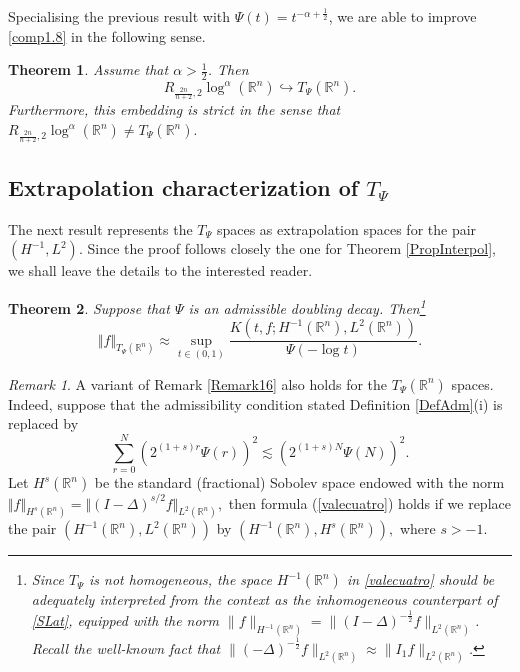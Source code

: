 \documentclass[11pt, a4paper,leqno]{amsart}
\newtheorem{theorem}{Theorem}
\theoremstyle{plain}
\numberwithin{equation}{section}
\theoremstyle{definition}
\theoremstyle{remark}
\newtheorem{remark}{Remark}
\def\R{\mathbb{R}}
\begin{document}
Specialising the previous result with $\Psi(t) = t^{-\alpha + \frac{1}{2}}$, we are able to improve 	\eqref{comp1.8} in the following sense.

\begin{theorem}
\label{Theorem4.8} Assume that $\alpha>\frac{1}{2}$. Then
$$
R_{\frac{2n}{n+2},2}\log^{\alpha}(\mathbb{R}^{n})\hookrightarrow T_{\Psi
}(\mathbb{R}^{n}). \label{414}%
$$
Furthermore, this embedding is strict in the sense that $R_{\frac{2n}{n+2},2}\log^{\alpha}(\mathbb{R}^{n})\neq T_{\Psi}(\mathbb{R}%
^{n}).$

\end{theorem}

\subsection{Extrapolation characterization of $T_\Psi$}
The next result represents the $T_{\Psi}$ spaces as extrapolation spaces for
the pair $(H^{-1},L^{2}).$ Since the proof follows closely the one for Theorem
\ref{PropInterpol}, we shall leave the details to the interested reader.

\begin{theorem}
\label{PropInterpolDoubling} Suppose that $\Psi$ is an admissible doubling decay. Then\footnote{Since $T_\Psi$ is not   homogeneous, the space $H^{-1}(\R^n)$  in \eqref{valecuatro} should be adequately interpreted from the context as the inhomogeneous counterpart of \eqref{SLat}, equipped with the  norm $\|f\|_{H^{-1}(\R^n)} = \|(I-\Delta)^{-\frac{1}{2}} f\|_{L^2(\R^n)}$. Recall the well-known fact that $\|(-\Delta)^{-\frac{1}{2}} f\|_{L^2(\R^n)} \approx \|I_1 f\|_{L^2(\R^n)}$.}
\begin{equation}
\Vert f\Vert_{T_{\Psi}(\mathbb{R}^{n})}\approx\sup_{t\in(0,1)}\frac
{K(t,f;H^{-1}(\mathbb{R}^{n}),L^{2}(\mathbb{R}^{n}))}{\Psi(-\log t)}.
\label{valecuatro}%
\end{equation}

\end{theorem}

\begin{remark}
A variant of Remark \ref{Remark16} also holds for the $T_{\Psi}(\mathbb{R}%
^{n})$ spaces. Indeed, suppose that the admissibility condition stated Definition \ref{DefAdm}(i) is replaced by
\[
\sum_{r=0}^{N}(2^{(1+s)r}\Psi(r))^{2}\lesssim(2^{(1+s)N}\Psi(N))^{2}.
\]
Let $H^{s}(\mathbb{R}^{n})$ be the standard (fractional) Sobolev space endowed
with the norm $\Vert f\Vert_{H^{s}(\mathbb{R}^{n})}=\Vert(I-\Delta
)^{s/2}f\Vert_{L^{2}(\mathbb{R}^{n})},$ then formula (\ref{valecuatro}) holds
if we replace the pair $(H^{-1}(\mathbb{R}^{n}),L^{2}(\mathbb{R}^{n}))$ by
$(H^{-1}(\mathbb{R}^{n}),H^{s}(\mathbb{R}^{n})),$ where $s>-1.$
\end{remark}
\end{document}
